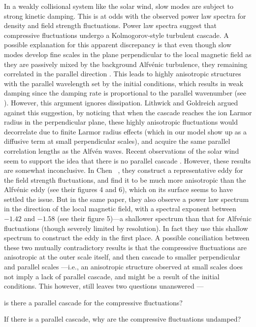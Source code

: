     In a weakly collisional system like the solar wind, slow modes are subject
    to strong kinetic damping. This is at odds with the observed power law spectra for density and
    field strength fluctuations. Power law spectra suggest that compressive fluctuations undergo a Kolmogorov-style
    turbulent cascade. A possible explanation for this apparent discrepancy is 
    that even though slow modes develop fine scales in the plane perpendicular to the local magnetic
    field as they are passively mixed by the background Alfv\'{e}nic turbulence, they
    remaining correlated in the parallel direction \cite{tome}. 
    This leads to highly
    anisotropic structures with the parallel wavelength set by the initial conditions,
    which results in weak damping since the damping rate is proportional to the parallel
    wavenumber (see ). However, this argument ignores 
    dissipation. Lithwick and Goldreich \cite{lithwick01}
    argued against this suggestion, by 
    noticing that when the cascade reaches the ion Larmor radius in the perpendicular
    plane, these highly anisotropic fluctuations would decorrelate due to finite Larmor
    radius effects (which in our model show up as a diffusive term at small perpendicular
    scales), and acquire the same parallel correlation
    lengths as the Alfv\'{e}n waves. Recent observations of the solar wind seem to support the idea that there is no
    parallel cascade \cite{chen11}. However, these results are somewhat inconclusive. In Chen
    \etal\, \cite{chen11}, they construct a representative eddy for the field strength
    fluctuations, and find it to be much more anisotropic than the Alfv\'{e}nic eddy (see
    their figures 4 and 6), which on its surface seems to have settled the issue. But in
    the same paper, they also observe a power law spectrum in the direction of the local
    magnetic field,
    with a spectral exponent between $-1.42$ and $-1.58$ (see their figure 5)---a shallower spectrum than
    that for Alfv\'{e}nic fluctuations (though severely limited by resolution). In fact
    they use this shallow spectrum to construct the eddy in
    the first place. A possible conciliation between these two mutually contradictory
    results is that the compressive fluctuations are
    anisotropic at the outer scale itself, and then cascade to smaller perpendicular and
    parallel scales \cite{chen14}---i.e., an anisotropic structure observed at small
    scales does not imply a lack of parallel cascade, and might be a result of the
    initial conditions.
    This however, still leaves two questions unanswered ---
    \begin{inparaenum}[(a)]
    \item is there a parallel cascade for the compressive fluctuations?
    \item If there is a parallel cascade, why are the compressive fluctuations undamped?
    \end{inparaenum}
    
